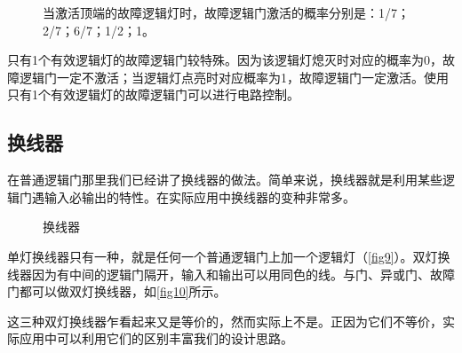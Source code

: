 \begin{figure}[!ht]
\begin{center}
{}
\end{center}
\caption{当激活顶端的故障逻辑灯时，故障逻辑门激活的概率分别是：\protect{}1/7；\protect{}2/7；\protect{}6/7；\protect{}1/2；\protect{}1。}
\label{i54:58}
\end{figure}

只有1个有效逻辑灯的故障逻辑门较特殊。因为该逻辑灯熄灭时对应的概率为0，故障逻辑门一定不激活；当逻辑灯点亮时对应概率为1，故障逻辑门一定激活。使用只有1个有效逻辑灯的故障逻辑门可以进行电路控制。

\subsection{换线器}
在普通逻辑门那里我们已经讲了换线器的做法。简单来说，换线器就是利用某些逻辑门遇输入必输出的特性。在实际应用中换线器的变种非常多。

\begin{figure}[!ht]
\centering
{}
\qquad
{}
\caption{换线器}
\end{figure}

单灯换线器只有一种，就是任何一个普通逻辑门上加一个逻辑灯（\autoref{fig9}）。双灯换线器因为有中间的逻辑门隔开，输入和输出可以用同色的线。与门、异或门、故障门都可以做双灯换线器，如\autoref{fig10}所示。

这三种双灯换线器乍看起来又是等价的，然而实际上不是。正因为它们不等价，实际应用中可以利用它们的区别丰富我们的设计思路。

